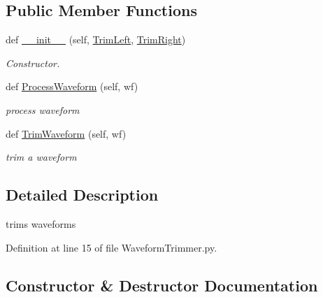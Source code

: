 \subsection*{Public Member Functions}
\begin{DoxyCompactItemize}
\item 
def \hyperlink{classSignalIntegrity_1_1TimeDomain_1_1Filters_1_1WaveformTrimmer_1_1WaveformTrimmer_a4bd17ae845afc3d863e564ff483b9d64}{\+\_\+\+\_\+init\+\_\+\+\_\+} (self, \hyperlink{classSignalIntegrity_1_1TimeDomain_1_1Filters_1_1FilterDescriptor_1_1FilterDescriptor_aa755b1fade9a131f66c5a448181a158e}{Trim\+Left}, \hyperlink{classSignalIntegrity_1_1TimeDomain_1_1Filters_1_1FilterDescriptor_1_1FilterDescriptor_a284517d97da4a4e39890e41cbfa2a007}{Trim\+Right})
\begin{DoxyCompactList}\small\item\em Constructor. \end{DoxyCompactList}\item 
def \hyperlink{classSignalIntegrity_1_1TimeDomain_1_1Filters_1_1WaveformTrimmer_1_1WaveformTrimmer_ae09bec195c9cb1d5819e73b7be169b11}{Process\+Waveform} (self, wf)
\begin{DoxyCompactList}\small\item\em process waveform \end{DoxyCompactList}\item 
def \hyperlink{classSignalIntegrity_1_1TimeDomain_1_1Filters_1_1WaveformTrimmer_1_1WaveformTrimmer_aba4602fa45a1eaabd2eb64f1866def53}{Trim\+Waveform} (self, wf)
\begin{DoxyCompactList}\small\item\em trim a waveform \end{DoxyCompactList}\end{DoxyCompactItemize}


\subsection{Detailed Description}
trims waveforms 

Definition at line 15 of file Waveform\+Trimmer.\+py.



\subsection{Constructor \& Destructor Documentation}
\mbox{\label{classSignalIntegrity_1_1TimeDomain_1_1Filters_1_1WaveformTrimmer_1_1WaveformTrimmer_a4bd17ae845afc3d863e564ff483b9d64}} 
